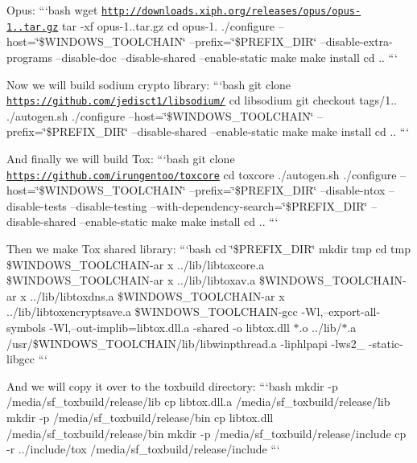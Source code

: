Opus\+: ```bash wget \href{http://downloads.xiph.org/releases/opus/opus-1.1.tar.gz}{\tt http\+://downloads.\+xiph.\+org/releases/opus/opus-\/1..\+tar.\+gz} tar -\/xf opus-\/1..\+tar.\+gz cd opus-\/1. ./configure --host=\char`\"{}\$\+W\+I\+N\+D\+O\+W\+S\+\_\+\+T\+O\+O\+L\+C\+H\+A\+I\+N\char`\"{} --prefix=\char`\"{}\$\+P\+R\+E\+F\+I\+X\+\_\+\+D\+I\+R\char`\"{} --disable-\/extra-\/programs --disable-\/doc --disable-\/shared --enable-\/static make make install cd .. ```

Now we will build sodium crypto library\+: ```bash git clone \href{https://github.com/jedisct1/libsodium/}{\tt https\+://github.\+com/jedisct1/libsodium/} cd libsodium git checkout tags/1.. ./autogen.sh ./configure --host=\char`\"{}\$\+W\+I\+N\+D\+O\+W\+S\+\_\+\+T\+O\+O\+L\+C\+H\+A\+I\+N\char`\"{} --prefix=\char`\"{}\$\+P\+R\+E\+F\+I\+X\+\_\+\+D\+I\+R\char`\"{} --disable-\/shared --enable-\/static make make install cd .. ```

And finally we will build Tox\+: ```bash git clone \href{https://github.com/irungentoo/toxcore}{\tt https\+://github.\+com/irungentoo/toxcore} cd toxcore ./autogen.sh ./configure --host=\char`\"{}\$\+W\+I\+N\+D\+O\+W\+S\+\_\+\+T\+O\+O\+L\+C\+H\+A\+I\+N\char`\"{} --prefix=\char`\"{}\$\+P\+R\+E\+F\+I\+X\+\_\+\+D\+I\+R\char`\"{} --disable-\/ntox --disable-\/tests --disable-\/testing --with-\/dependency-\/search=\char`\"{}\$\+P\+R\+E\+F\+I\+X\+\_\+\+D\+I\+R\char`\"{} --disable-\/shared --enable-\/static make make install cd .. ```

Then we make Tox shared library\+: ```bash cd \char`\"{}\$\+P\+R\+E\+F\+I\+X\+\_\+\+D\+I\+R\char`\"{} mkdir tmp cd tmp \$\+W\+I\+N\+D\+O\+W\+S\+\_\+\+T\+O\+O\+L\+C\+H\+A\+I\+N-\/ar x ../lib/libtoxcore.a \$\+W\+I\+N\+D\+O\+W\+S\+\_\+\+T\+O\+O\+L\+C\+H\+A\+I\+N-\/ar x ../lib/libtoxav.a \$\+W\+I\+N\+D\+O\+W\+S\+\_\+\+T\+O\+O\+L\+C\+H\+A\+I\+N-\/ar x ../lib/libtoxdns.a \$\+W\+I\+N\+D\+O\+W\+S\+\_\+\+T\+O\+O\+L\+C\+H\+A\+I\+N-\/ar x ../lib/libtoxencryptsave.a \$\+W\+I\+N\+D\+O\+W\+S\+\_\+\+T\+O\+O\+L\+C\+H\+A\+I\+N-\/gcc -\/\+Wl,--export-\/all-\/symbols -\/\+Wl,--out-\/implib=libtox.\+dll.\+a -\/shared -\/o libtox.\+dll $\ast$.o ../lib/$\ast$.a /usr/\$\+W\+I\+N\+D\+O\+W\+S\+\_\+\+T\+O\+O\+L\+C\+H\+A\+I\+N/lib/libwinpthread.a -\/liphlpapi -\/lws2\+\_ -\/static-\/libgcc ```

And we will copy it over to the {\ttfamily toxbuild} directory\+: ```bash mkdir -\/p /media/sf\+\_\+toxbuild/release/lib cp libtox.\+dll.\+a /media/sf\+\_\+toxbuild/release/lib mkdir -\/p /media/sf\+\_\+toxbuild/release/bin cp libtox.\+dll /media/sf\+\_\+toxbuild/release/bin mkdir -\/p /media/sf\+\_\+toxbuild/release/include cp -\/r ../include/tox /media/sf\+\_\+toxbuild/release/include ```

